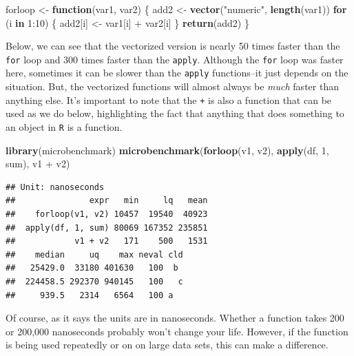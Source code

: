 \documentclass[]{tufte-book}
\newenvironment{Shaded}{}{}
\newcommand{\KeywordTok}[1]{\textcolor[rgb]{0.00,0.44,0.13}{\textbf{#1}}}
\newcommand{\DecValTok}[1]{\textcolor[rgb]{0.25,0.63,0.44}{#1}}
\newcommand{\StringTok}[1]{\textcolor[rgb]{0.25,0.44,0.63}{#1}}
\newcommand{\ControlFlowTok}[1]{\textcolor[rgb]{0.00,0.44,0.13}{\textbf{#1}}}
\newcommand{\OperatorTok}[1]{\textcolor[rgb]{0.40,0.40,0.40}{#1}}
\newcommand{\NormalTok}[1]{#1}
\theoremstyle{definition}
\theoremstyle{definition}
\theoremstyle{remark}
\begin{document}
\begin{Shaded}
\begin{Highlighting}[]
\NormalTok{forloop <-}\StringTok{ }\ControlFlowTok{function}\NormalTok{(var1, var2) \{}
\NormalTok{    add2 <-}\StringTok{ }\KeywordTok{vector}\NormalTok{(}\StringTok{"numeric"}\NormalTok{, }\KeywordTok{length}\NormalTok{(var1))}
    \ControlFlowTok{for}\NormalTok{ (i }\ControlFlowTok{in} \DecValTok{1}\OperatorTok{:}\DecValTok{10}\NormalTok{) \{}
\NormalTok{        add2[i] <-}\StringTok{ }\NormalTok{var1[i] }\OperatorTok{+}\StringTok{ }\NormalTok{var2[i]}
\NormalTok{    \}}
    \KeywordTok{return}\NormalTok{(add2)}
\NormalTok{\}}
\end{Highlighting}
\end{Shaded}

Below, we can see that the vectorized version is nearly 50 times faster
than the \texttt{for} loop and 300 times faster than the \texttt{apply}.
Although the \texttt{for} loop was faster here, sometimes it can be
slower than the \texttt{apply} functions--it just depends on the
situation. But, the vectorized functions will almost always be
\emph{much} faster than anything else. It's important to note that the
\texttt{+} is also a function that can be used as we do below,
highlighting the fact that anything that does something to an object in
\texttt{R} is a function.

\begin{Shaded}
\begin{Highlighting}[]
\KeywordTok{library}\NormalTok{(microbenchmark)}
\KeywordTok{microbenchmark}\NormalTok{(}\KeywordTok{forloop}\NormalTok{(v1, v2), }\KeywordTok{apply}\NormalTok{(df, }\DecValTok{1}\NormalTok{, sum), }
\NormalTok{    v1 }\OperatorTok{+}\StringTok{ }\NormalTok{v2)}
\end{Highlighting}
\end{Shaded}

\begin{verbatim}
## Unit: nanoseconds
##               expr   min     lq   mean
##    forloop(v1, v2) 10457  19540  40923
##  apply(df, 1, sum) 80069 167352 235851
##            v1 + v2   171    500   1531
##    median     uq    max neval cld
##   25429.0  33180 401630   100  b 
##  224458.5 292370 940145   100   c
##     939.5   2314   6564   100 a
\end{verbatim}

Of course, as it says the units are in nanoseconds. Whether a function
takes 200 or 200,000 nanoseconds probably won't change your life.
However, if the function is being used repeatedly or on on large data
sets, this can make a difference.
\end{document}
